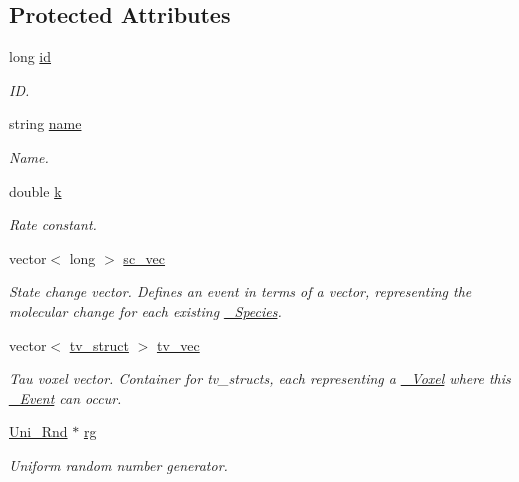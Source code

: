 \subsection*{Protected Attributes}
\begin{DoxyCompactItemize}
\item 
long \hyperlink{classnw_1_1___event_a8f7ce287f596266dd763ec7db2f74090}{id}
\begin{DoxyCompactList}\small\item\em I\+D. \end{DoxyCompactList}\item 
string \hyperlink{classnw_1_1___event_ab4f50a54039cd4957bdca55049178562}{name}
\begin{DoxyCompactList}\small\item\em Name. \end{DoxyCompactList}\item 
double \hyperlink{classnw_1_1___event_afca0ae816e9834add07db8e9a6618faa}{k}
\begin{DoxyCompactList}\small\item\em Rate constant. \end{DoxyCompactList}\item 
vector$<$ long $>$ \hyperlink{classnw_1_1___event_a560c8b6f9954a43f5d5f80204473b64d}{sc\+\_\+vec}
\begin{DoxyCompactList}\small\item\em State change vector. Defines an event in terms of a vector, representing the molecular change for each existing \hyperlink{classnw_1_1___species}{\+\_\+\+Species}. \end{DoxyCompactList}\item 
vector$<$ \hyperlink{structnw_1_1___event_1_1tv__struct}{tv\+\_\+struct} $>$ \hyperlink{classnw_1_1___event_a6351b58d94923ed58e0b2cf6c9445d2e}{tv\+\_\+vec}
\begin{DoxyCompactList}\small\item\em Tau voxel vector. Container for tv\+\_\+structs, each representing a \hyperlink{classnw_1_1___voxel}{\+\_\+\+Voxel} where this \hyperlink{classnw_1_1___event}{\+\_\+\+Event} can occur. \end{DoxyCompactList}\item 
\hyperlink{classnw_1_1_uni___rnd}{Uni\+\_\+\+Rnd} $\ast$ \hyperlink{classnw_1_1___event_af92482aeea55562560573ecccd5ab108}{rg}
\begin{DoxyCompactList}\small\item\em Uniform random number generator. \end{DoxyCompactList}\item 

\end{DoxyCompactItemize}

